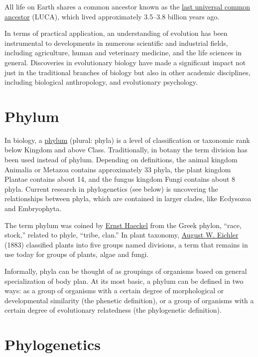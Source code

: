 All life on Earth shares a common ancestor known as the
\href{https://en.wikipedia.org/wiki/Last_universal_common_ancestor}{last
universal common ancestor} (LUCA), which lived approximately 3.5--3.8
billion years ago.

In terms of practical application, an understanding of evolution has
been instrumental to developments in numerous scientific and industrial
fields, including agriculture, human and veterinary medicine, and the
life sciences in general. Discoveries in evolutionary biology have made
a significant impact not just in the traditional branches of biology but
also in other academic disciplines, including biological anthropology,
and evolutionary psychology.

\section{Phylum}\label{phylum}

In biology, a \href{https://en.wikipedia.org/wiki/Phylum}{phylum}
(plural: phyla) is a level of classification or taxonomic rank below
Kingdom and above Class. Traditionally, in botany the term division has
been used instead of phylum. Depending on definitions, the animal
kingdom Animalia or Metazoa contains approximately 33 phyla, the plant
kingdom Plantae contains about 14, and the fungus kingdom Fungi contains
about 8 phyla. Current research in phylogenetics (see below) is
uncovering the relationships between phyla, which are contained in
larger clades, like Ecdysozoa and Embryophyta.

The term phylum was coined by \href{https://en.wikipedia.org/wiki/Ernst_Haeckel}{Ernst Haeckel} from the Greek phylon,
``race, stock,'' related to phyle, ``tribe, clan.'' In plant taxonomy,
\href{https://en.wikipedia.org/wiki/August_W._Eichler}{August W. Eichler} (1883) classified plants into five groups named
divisions, a term that remains in use today for groups of plants, algae
and fungi.

Informally, phyla can be thought of as groupings of organisms based on
general specialization of body plan. At its most basic, a phylum can be
defined in two ways: as a group of organisms with a certain degree of
morphological or developmental similarity (the phenetic definition), or
a group of organisms with a certain degree of evolutionary relatedness
(the phylogenetic definition).

\section{Phylogenetics}\label{phylogenetics}

